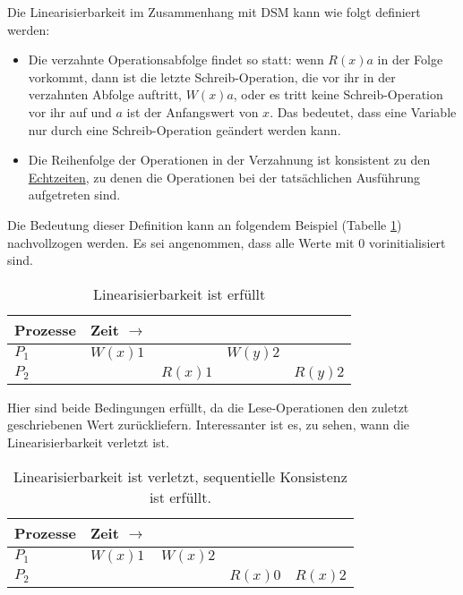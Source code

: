Die Linearisierbarkeit im Zusammenhang mit DSM kann wie folgt definiert werden:

\begin{itemize}
	\item Die verzahnte Operationsabfolge findet so statt: wenn $R(x)a$ in der Folge vorkommt, dann ist die letzte Schreib-Operation, die vor ihr in der verzahnten Abfolge auftritt, $W(x)a$, oder es tritt keine Schreib-Operation vor ihr auf und $a$ ist der Anfangswert von $x$. Das bedeutet, dass eine Variable nur durch eine Schreib-Operation geändert werden kann.
	\item Die Reihenfolge der Operationen in der Verzahnung ist konsistent zu den \underline{Echtzeiten}, zu denen die Operationen bei der tatsächlichen Ausführung aufgetreten sind.
\end{itemize}

Die Bedeutung dieser Definition kann an folgendem Beispiel (Tabelle \ref{tab:1}) nachvollzogen werden. Es sei angenommen, dass alle Werte mit $0$ vorinitialisiert sind.

\begin{table}
	\centering
		\begin{tabular}{l | l l l l}
			\textbf{Prozesse} & \textbf{Zeit} $\rightarrow$ & \\
			\hline
			$P_{1}$ & $W(x)1$ & & $W(y)2$ \\
			$P_{2}$ & & $R(x)1$ & & $R(y)2$ \\
		\end{tabular}
	\caption{Linearisierbarkeit ist erfüllt}
	\label{tab:1}
\end{table}

Hier sind beide Bedingungen erfüllt, da die Lese-Operationen den zuletzt geschriebenen Wert zurückliefern. Interessanter ist es, zu sehen, wann die Linearisierbarkeit verletzt ist.

\begin{table}
	\centering
		\begin{tabular}{l | l l l l}
		\textbf{Prozesse} & \textbf{Zeit} $\rightarrow$ \\
		\hline
		$P_{1}$ & $W(x)1$ & $W(x)2$ \\
		$P_{2}$ & & & \color{red} $R(x)0$ & \color{black} $R(x)2$ \\
		\end{tabular}
	\caption{Linearisierbarkeit ist verletzt, sequentielle Konsistenz ist erfüllt.}
	\label{tab:2}
\end{table}

